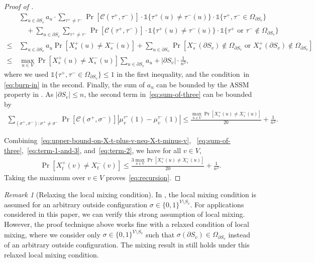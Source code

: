\documentclass[11pt]{amsart}
\renewcommand{\Pr}{\mathop{\mathrm{Pr}}\nolimits}
\newcommand{\abs}[1]{\ensuremath{\left\vert#1\right\vert}}
\renewcommand{\P}{\Pr}
\theoremstyle{definition}
\theoremstyle{remark}
\newtheorem*{remark}{Remark}
\begin{document}
\begin{proof}[Proof of ]
\begin{align*}
  &\sum_{u\in \partial S_v}a_u\cdot \sum_{\tau^+ \neq \tau^-}\P[\mathcal{C}(\tau^+,\tau^-)]\cdot \mathbb{1}\{\tau^+(u)\neq \tau^-(u) \}\cdot\mathbb{1}\{\tau^+, \tau^-\in \Omega_{\partial S_v}\}\\
    &\quad +\sum_{u\in \partial S_v}\sum_{\tau^+ \neq \tau^-}\P[\mathcal{C}(\tau^+,\tau^-)]\cdot\mathbb{1}\{\tau^+(u)\neq \tau^-(u) \}\cdot \mathbb{1}\{\tau^+\text{ or }\tau^-\notin \Omega_{\partial S_v}\}\\
    \leq\,&\sum_{u\in \partial S_v}a_u \P\left[X_s^+(u)\neq X_s^-(u)\right] + \sum_{u\in \partial S_v} \Pr\left[X^-_s(\partial S_v) \notin \Omega_{\partial S_v}\text{ or }X^+_s(\partial S_v) \notin \Omega_{\partial S_v}\right]\\
    \leq\,& \max_{u \in V} \Pr[X_s^+(u)\neq X_s^-(u)] \sum_{u\in \partial S_v} a_u + \abs{\partial S_v} \cdot \frac{1}{n^3},
\end{align*}
where we used $\mathbb{1}\{\tau^+, \tau^-\in \Omega_{\partial S_v}\}\le 1$ in the first inequality, and the condition~in \eqref{eq:burn-in} in the second.
Finally, the sum of $a_u$ can be bounded by the ASSM property in .
As $\abs{\partial S_v}\le n$, the second term in~\eqref{eq:sum-of-three} can be bounded by
\begin{align}\label{eq:term-2}
    \sum_{(\sigma^+,\sigma^-):\sigma^+\neq \sigma^-} \Pr[\mathcal{C}(\sigma^+,\sigma^-)] \left | \mu_v^{\tau^+}(1)-\mu_v^{\tau^-}(1)\right | \leq \frac{\max_{u \in V} \Pr[X_s^+(u)\neq X_s^-(u)]}{20} + \frac{1}{n^2}.
\end{align}

Combining~\eqref{eq:upper-bound-on-X-t-plus-v-neq-X-t-minus-v}, ~\eqref{eq:sum-of-three},~\eqref{eq:term-1-and-3}, and~\eqref{eq:term-2}, we have
for all $v \in V$,
\begin{align*}
\P[X_t^+(v)\neq X_t^-(v)] \leq \frac{3\max_{u\in V} \P[X_s^+(u)\neq X_s^-(u)]}{20} + \frac{1}{n^2}.
\end{align*}
Taking the maximum over $v\in V$ proves~\eqref{eq:recursion}.
\end{proof}


\begin{remark}[Relaxing the local mixing condition]
  In , the local mixing condition is assumed for an arbitrary outside configuration $\sigma \in \{0,1\}^{V \setminus S_v}$. For applications considered in this paper, we can verify this strong assumption of local mixing. However, the proof technique above works fine with a relaxed condition of local mixing, where we consider only $\sigma \in \{0,1\}^{V \setminus S_v}$ such that $\sigma(\partial S_v) \in \Omega_{\partial S_v}$ instead of an arbitrary outside configuration. The mixing result in  still holds under this relaxed local mixing condition.
\end{remark}
\end{document}
